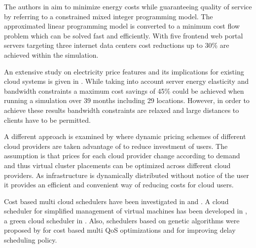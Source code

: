 The authors in \cite{rao2010minimizing} aim to minimize energy costs while guaranteeing quality of service by referring to a constrained mixed integer programming model. The approximated linear programming model is converted to a minimum cost flow problem which can be solved fast and efficiently. With five frontend web portal servers targeting three internet data centers cost reductions up to 30\% are achieved within the simulation. 

An extensive study on electricity price features and its implications for existing cloud systems is given in \cite{qureshi2009cutting}. While taking into account server energy elasticity and bandwidth constraints a maximum cost savings of 45\% could be achieved when running a simulation over 39 months including 29 locations. However, in order to achieve these results bandwidth constraints are relaxed and large distances to clients have to be permitted. 

A different approach is examined by \cite{simarro2011dynamic} where dynamic pricing schemes of different cloud providers are taken advantage of to reduce investment of users. The assumption is that prices for each cloud provider change according to demand and thus virtual cluster placements can be optimized across different cloud providers. As infrastructure is dynamically distributed without notice of the user it provides an efficient and convenient way of reducing costs for cloud users. 

Cost based multi cloud schedulers have been investigated in \cite{le2009cost} and \cite{tordsson2012cloud}. 
A cloud scheduler for simplified management of virtual machines has been developed in \cite{armstrong2010cloud}, a green cloud scheduler in \cite{lucanin2013take}. 
Also, schedulers based on genetic algorithms were proposed by \cite{dutta2011genetic} for cost based multi QoS optimizations and \cite{ge2010ga} for improving delay scheduling policy. 


